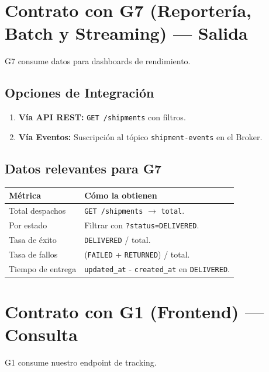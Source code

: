 \documentclass[11pt, a4paper]{article}
\begin{document}
\section{Contrato con G7 (Reportería, Batch y Streaming) --- Salida}

G7 consume datos para dashboards de rendimiento.

\subsection{Opciones de Integración}

\begin{enumerate}[noitemsep]
  \item \textbf{Vía API REST:} \texttt{GET /shipments} con filtros.
  \item \textbf{Vía Eventos:} Suscripción al tópico \texttt{shipment-events} en el Broker.
\end{enumerate}

\subsection{Datos relevantes para G7}

\begin{table}[ht!]
\centering
\renewcommand{\arraystretch}{1.4}
\begin{tabularx}{\textwidth}{l X}
  \toprule
  \textbf{Métrica} & \textbf{Cómo la obtienen} \\
  \midrule
  Total despachos       & \texttt{GET /shipments} $\rightarrow$ \texttt{total}. \\
  Por estado            & Filtrar con \texttt{?status=DELIVERED}. \\
  Tasa de éxito         & \texttt{DELIVERED} / total. \\
  Tasa de fallos        & (\texttt{FAILED} + \texttt{RETURNED}) / total. \\
  Tiempo de entrega     & \texttt{updated\_at} - \texttt{created\_at} en \texttt{DELIVERED}. \\
  \bottomrule
\end{tabularx}
\end{table}


\section{Contrato con G1 (Frontend) --- Consulta}

G1 consume nuestro endpoint de tracking.
\end{document}
